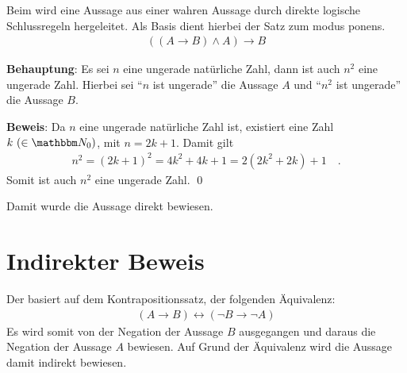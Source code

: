 \begin{Unit}
Beim  wird eine Aussage aus 
einer wahren Aussage durch direkte logische Schlussregeln hergeleitet. Als 
Basis dient hierbei der Satz zum modus ponens.
\begin{align}
  ((A \rightarrow B) \land A) \rightarrow B
\end{align}
\end{Unit}
\begin{Unit}[Beispiel]
\label{bsp:Aus-DirekterBeweis}

\textbf{Behauptung}: Es sei $n$ eine ungerade natürliche Zahl, dann ist auch 
$n^2$ eine ungerade Zahl. Hierbei sei \enquote{$n$ ist ungerade} die Aussage 
$A$ und \enquote{$n^2$ ist ungerade} die Aussage $B$.

\textbf{Beweis}: Da $n$ eine ungerade natürliche Zahl ist, existiert eine Zahl 
$k\ (\in \NN_0)$, mit $n=2k+1$. Damit gilt 
\begin{align}
  n^2 = (2k+1)^2 = 4k^2+4k+1 = 2(2k^2+2k)+1 \quad .
\end{align}
Somit ist auch $n^2$ eine ungerade Zahl. \qed

Damit wurde die Aussage direkt bewiesen.
\end{Unit}

\section{Indirekter Beweis}
\label{sec:Beweis - indirekt}

\begin{Unit}
Der  basiert auf dem 
Kontrapositionssatz, der folgenden Äquivalenz:
\begin{align}
  (A \rightarrow B) \leftrightarrow (\neg B \rightarrow \neg A) 
\end{align}
Es wird somit von der Negation der Aussage $B$ ausgegangen und daraus die 
Negation der Aussage $A$ bewiesen. Auf Grund der Äquivalenz wird die Aussage
damit indirekt bewiesen. \vspace*{0.5ex}
\end{Unit}

